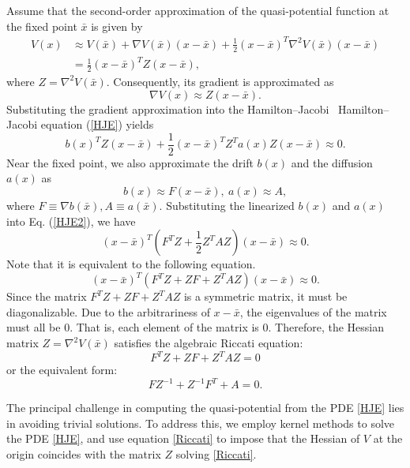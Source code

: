\documentclass[11pt]{article}
\theoremstyle{plain}      %
\theoremstyle{definition} %
\providecommand{\DIFaddtex}[1]{{\protect\color{blue}#1}} %
\providecommand{\DIFdeltex}[1]{{\protect\color{red}#1}} %
\providecommand{\DIFaddbegin}{} %
\providecommand{\DIFaddend}{} %
\providecommand{\DIFdelbegin}{} %
\providecommand{\DIFdelend}{} %
\providecommand{\DIFadd}[1]{\texorpdfstring{\DIFaddtex{#1}}{#1}} %
\providecommand{\DIFdel}[1]{\texorpdfstring{\DIFdeltex{#1}}{}} %
\newcommand{\DIFscaledelfig}{1.0}
\newlength{\DIFdelgraphicswidth} %
\newlength{\DIFdelgraphicsheight} %
\newcommand{\DIFaddincludegraphics}[2][]{{\color{blue}\fbox{\DIFOincludegraphics[#1]{#2}}}} %
\newcommand{\DIFdelincludegraphics}[2][]{%
\sbox{\DIFdelgraphicsbox}{\DIFOincludegraphics[#1]{#2}}%
\settoboxwidth{\DIFdelgraphicswidth}{\DIFdelgraphicsbox} %
\settoboxtotalheight{\DIFdelgraphicsheight}{\DIFdelgraphicsbox} %
\scalebox{\DIFscaledelfig}{%
\parbox[b]{\DIFdelgraphicswidth}{\usebox{\DIFdelgraphicsbox}\\[-\baselineskip] \rule{\DIFdelgraphicswidth}{0em}}\llap{\resizebox{\DIFdelgraphicswidth}{\DIFdelgraphicsheight}{%
\setlength{\unitlength}{\DIFdelgraphicswidth}%
\begin{picture}(1,1)%
\thicklines\linethickness{2pt} %
{\color[rgb]{1,0,0}\put(0,0){\framebox(1,1){}}}%
{\color[rgb]{1,0,0}\put(0,0){\line( 1,1){1}}}%
{\color[rgb]{1,0,0}\put(0,1){\line(1,-1){1}}}%
\end{picture}%
}\hspace*{3pt}}} %
} %
\DeclareRobustCommand{\DIFaddbegin}{\DIFOaddbegin \let\includegraphics\DIFaddincludegraphics} %
\DeclareRobustCommand{\DIFaddend}{\DIFOaddend \let\includegraphics\DIFOincludegraphics} %
\DeclareRobustCommand{\DIFdelbegin}{\DIFOdelbegin \let\includegraphics\DIFdelincludegraphics} %
\DeclareRobustCommand{\DIFdelend}{\DIFOaddend \let\includegraphics\DIFOincludegraphics} %
\begin{document}
Assume that the second-order approximation of the quasi-potential function at the fixed point \( \bar{x} \) is given by
\[
\begin{aligned}
V(x) & \approx V(\bar{x}) + \nabla V(\bar{x}) (x - \bar{x}) + \frac{1}{2} (x - \bar{x})^T \nabla^2 V(\bar{x}) (x - \bar{x}) \\
& = \frac{1}{2} (x - \bar{x})^T Z (x - \bar{x}),
\end{aligned}
\]
where \( Z = \nabla^2 V(\bar{x}) \). Consequently, its gradient is approximated as
\[
\nabla V(x) \approx Z (x - \bar{x}).
\]
Substituting the gradient approximation into the \DIFdelbegin \DIFdel{Hamilton–Jacobi }\DIFdelend\ \DIFaddbegin \DIFadd{Hamilton--Jacobi }\DIFaddend equation (\ref{HJE}) yields
\begin{equation}\label{HJE2}
b(x)^T Z (x - \bar{x}) + \frac{1}{2} (x - \bar{x})^T Z^T a(x) Z (x - \bar{x}) \approx 0.
\end{equation}
Near the fixed point, we also approximate the drift $b(x)$ and the diffusion $a(x)$ as
\[
b(x) \approx F(x-\bar{x}), \ a(x) \approx A,
\]
where $F \equiv \nabla b(\bar{x}), A \equiv a(\bar{x})$. Substituting the linearized $b(x)$ and $a(x)$ into Eq. (\ref{HJE2}), we have
\begin{equation}\label{HJE3}
(x - \bar{x})^T (F^TZ + \frac{1}{2} Z^TAZ) (x - \bar{x}) \approx 0.
\end{equation}
Note that it is equivalent to the following equation.
\begin{equation}\label{HJE4}
(x - \bar{x})^T (F^TZ + ZF + Z^TAZ) (x - \bar{x}) \approx 0.
\end{equation}
Since the matrix $F^TZ + ZF + Z^TAZ$ is a symmetric matrix, it must be diagonalizable. Due to the arbitrariness of $x - \bar{x}$, the eigenvalues of the matrix must all be 0. That is, each element of the matrix is 0. Therefore, the Hessian matrix \( Z = \nabla^2 V(\bar{x}) \) satisfies the algebraic Riccati equation:
\begin{equation}\label{HJE5}
 F^TZ + ZF + Z^TAZ= 0
\end{equation}
or the equivalent form:
\begin{equation}
\label{Riccati}
FZ^{-1} + Z^{-1}F^T + A = 0.
\end{equation}

The principal challenge in computing the quasi-potential from the PDE \eqref{HJE} lies in avoiding trivial solutions. To address this, we employ kernel methods to solve the PDE \eqref{HJE}, and use equation \eqref{Riccati} to impose that the Hessian of \( V \) at the origin coincides with the matrix \( Z \) solving \eqref{Riccati}.
\end{document}
